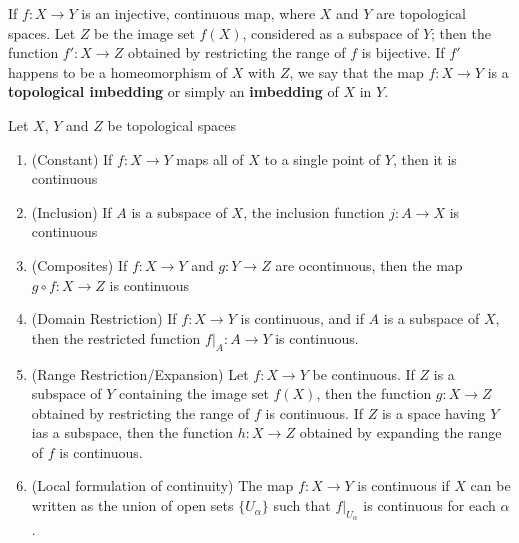 If $f:X\to Y$ is an injective, continuous map, where $X$ and $Y$ are topological spaces. Let $Z$ be the image set $f(X)$, considered as a subspace of $Y$; then the function $f':X\to Z$ obtained by restricting the range of $f$ is bijective. If $f'$ happens to be a homeomorphism of $X$ with $Z$, we say that the map $f:X\to Y$ is a \textbf{topological imbedding} or simply an \textbf{imbedding} of $X$ in $Y$.

\begin{theorem}
    Let $X$, $Y$ and $Z$ be topological spaces 
    \begin{enumerate}
        \item (Constant) If $f:X\to Y$ maps all of $X$ to a single point of $Y$, then it is continuous 
        \item (Inclusion) If $A$ is a subspace of $X$, the inclusion function $j:A\to X$ is continuous 
        \item (Composites) If $f:X\to Y$ and $g:Y\to Z$ are ocontinuous, then the map $g\circ f: X\to Z$ is continuous
        \item (Domain Restriction) If $f:X\to Y$ is continuous, and if $A$ is a subspace of $X$, then the restricted function $f|_A:A\to Y$ is continuous.
        \item (Range Restriction/Expansion) Let $f:X\to Y$ be continuous. If $Z$ is a subspace of $Y$ containing the image set $f(X)$, then the function $g:X\to Z$ obtained by restricting the range of $f$ is continuous. If $Z$ is a space having $Y$ ias a subspace, then the function $h:X\to Z$ obtained by expanding the range of $f$ is continuous.
        \item (Local formulation of continuity) The map $f:X\to Y$ is continuous if $X$ can be written as the union of open sets $\{U_\alpha\}$ such that $f|_{U_\alpha}$ is continuous for each $\alpha$.
    \end{enumerate}
\end{theorem}
